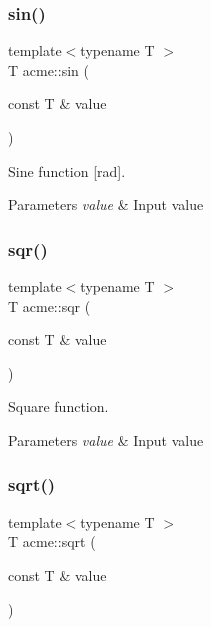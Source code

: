 \subsubsection{\texorpdfstring{sin()}{sin()}}
{\footnotesize\ttfamily template$<$typename T $>$ \\
T acme\+::sin (\begin{DoxyParamCaption}\item[{const T \&}]{value }\end{DoxyParamCaption})\hspace{0.3cm}{\ttfamily [inline]}}



Sine function \mbox{[}rad\mbox{]}. 


\begin{DoxyParams}{Parameters}
{\em value} & Input value \\
\hline
\end{DoxyParams}
\mbox{\label{namespaceacme_a722297e283d0b656d1b3f64222acb175}} 
\subsubsection{\texorpdfstring{sqr()}{sqr()}}
{\footnotesize\ttfamily template$<$typename T $>$ \\
T acme\+::sqr (\begin{DoxyParamCaption}\item[{const T \&}]{value }\end{DoxyParamCaption})\hspace{0.3cm}{\ttfamily [inline]}}



Square function. 


\begin{DoxyParams}{Parameters}
{\em value} & Input value \\
\hline
\end{DoxyParams}
\mbox{\label{namespaceacme_a6727bc4e9b202cb40e59065a01d9368b}} 
\subsubsection{\texorpdfstring{sqrt()}{sqrt()}}
{\footnotesize\ttfamily template$<$typename T $>$ \\
T acme\+::sqrt (\begin{DoxyParamCaption}\item[{const T \&}]{value }\end{DoxyParamCaption})\hspace{0.3cm}{\ttfamily [inline]}}



